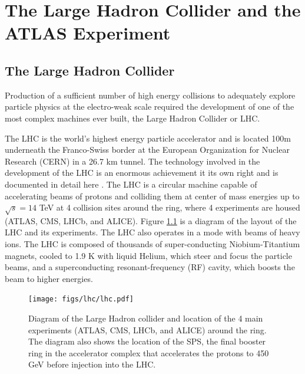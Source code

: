 \chapter[The Large Hadron Collider and the ATLAS Experiment][The Large Hadron Collider and the ATLAS Experiment]{The Large Hadron Collider and the ATLAS Experiment}
\label{chapter:lhc}
\section{The Large Hadron Collider}


Production of a sufficient number of high energy collisions to adequately explore
particle physics at the electro-weak scale required the development of one
of the most complex machines ever built, the Large Hadron Collider or LHC. 

The LHC is the world's highest energy particle accelerator 
and is located 100m underneath the Franco-Swiss border at the European Organization
for Nuclear Research (CERN) in a 26.7 km tunnel. The technology involved in the development of the LHC is an enormous achievement
it its own right and is documented in detail here \cite{1748-0221-3-08-S08001,Pettersson:291782,Linnecar:1176380}. 
The LHC is a circular machine capable of accelerating beams of protons and colliding them at center of mass 
energies up to $\sqrt{s} = 14$ TeV at 4 collision sites around the ring, where 4 experiments
are housed (ATLAS\cite{ATLAS_detector}, CMS\cite{1748-0221-3-08-S08004}, LHCb\cite{1748-0221-3-08-S08005}, and ALICE\cite{1748-0221-3-08-S08002}). Figure \ref{figure:lhc_lhc} is a diagram
of the layout of the LHC and its experiments\cite{Team:40525}. The LHC also operates in a mode with beams of 
heavy ions. The LHC is composed of thousands of super-conducting Niobium-Titantium 
magnets, cooled to 1.9 K with liquid Helium, which steer and focus the 
particle beams, and a superconducting resonant-frequency (RF) cavity, which boosts the beam
to higher energies. 

\begin{figure}[!t]
\centering 
\texttt{[image: figs/lhc/lhc.pdf]}
\caption{ Diagram of the Large Hadron collider and location of the 4 main experiments (ATLAS, CMS, LHCb, and ALICE) around
  the ring. The diagram also shows the location of the SPS, the final booster ring in the accelerator complex that accelerates
    the protons to 450 GeV before injection into the LHC. 
}
\label{figure:lhc_lhc}
\end{figure}



